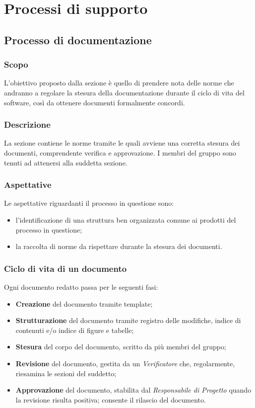 \section{Processi di supporto}
\subsection{Processo di documentazione}
\subsubsection{Scopo}
L'obiettivo proposto dalla sezione è quello di prendere nota delle norme che andranno a regolare la stesura della documentazione durante il ciclo di vita del software, così da ottenere documenti formalmente concordi.
\subsubsection{Descrizione}
La sezione contiene le norme tramite le quali avviene una corretta stesura dei documenti, comprendente verifica e approvazione. I membri del gruppo sono tenuti ad attenersi alla suddetta sezione.
\subsubsection{Aspettative}
Le aspettative riguardanti il processo in questione sono:
\begin{itemize}
	\item l'identificazione di una struttura ben organizzata comune ai prodotti del processo in questione;
	\item la raccolta di norme da rispettare durante la stesura dei documenti.
\end{itemize}
\subsubsection{Ciclo di vita di un documento}
Ogni documento redatto passa per le seguenti fasi:
\begin{itemize}
	\item \textbf{Creazione} del documento tramite template;
	\item \textbf{Strutturazione} del documento tramite registro delle modifiche,  indice di contenuti e/o indice di figure e tabelle;
	\item \textbf{Stesura} del corpo del documento,  scritto da più membri del gruppo;
	\item \textbf{Revisione} del documento, gestita da un \textit{Verificatore} che,  regolarmente,  riesamina le sezioni del suddetto;
	\item \textbf{Approvazione} del documento, stabilita dal \textit{Responsabile di Progetto} quando la revisione risulta positiva; consente il rilascio del documento.
\end{itemize}
